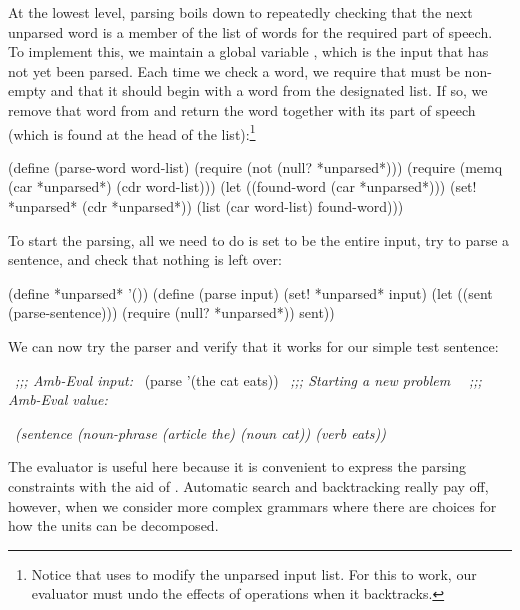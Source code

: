 \noindent
At the lowest level, parsing boils down to repeatedly checking that the next
unparsed word is a member of the list of words for the required part of speech.
To implement this, we maintain a global variable , which is
the input that has not yet been parsed.  Each time we check a word, we require
that  must be non-empty and that it should begin with a word
from the designated list.  If so, we remove that word from 
and return the word together with its part of speech (which is found at the
head of the list):\footnote{Notice that  uses  to
modify the unparsed input list.  For this to work, our  evaluator
must undo the effects of  operations when it backtracks.}

\begin{codeBlock}
(define (parse-word word-list)
  (require (not (null? *unparsed*)))
  (require (memq (car *unparsed*) (cdr word-list)))
  (let ((found-word (car *unparsed*)))
    (set! *unparsed* (cdr *unparsed*))
    (list (car word-list) found-word)))
\end{codeBlock}

\noindent
To start the parsing, all we need to do is set  to be the
entire input, try to parse a sentence, and check that nothing is left over:

\begin{codeBlock}
(define *unparsed* '())
(define (parse input)
  (set! *unparsed* input)
  (let ((sent (parse-sentence)))
    (require (null? *unparsed*)) sent))
\end{codeBlock}

\noindent
We can now try the parser and verify that it works for our simple test
sentence:

\begin{codeBlock}
~\textit{;;; Amb-Eval input:}~
(parse '(the cat eats))
~\textit{;;; Starting a new problem}~
~\textit{;;; Amb-Eval value:}~
\end{codeBlock}
\begin{compactCodeBlock}
~\textit{(sentence (noun-phrase (article the) (noun cat)) (verb eats))}~
\end{compactCodeBlock}

\noindent
The  evaluator is useful here because it is convenient to express the
parsing constraints with the aid of .  Automatic search and
backtracking really pay off, however, when we consider more complex grammars
where there are choices for how the units can be decomposed.

